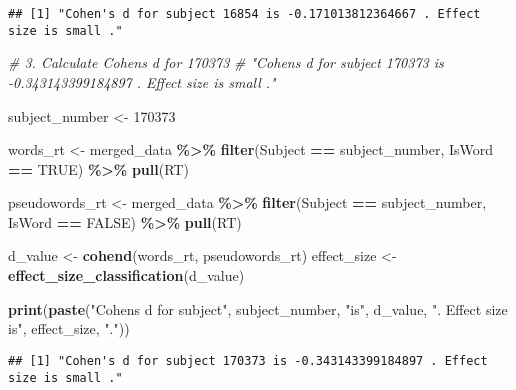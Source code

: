 \documentclass[
]{article}
\newenvironment{Shaded}{\begin{snugshade}}{\end{snugshade}}
\newcommand{\CommentTok}[1]{\textcolor[rgb]{0.56,0.35,0.01}{\textit{#1}}}
\newcommand{\ConstantTok}[1]{\textcolor[rgb]{0.56,0.35,0.01}{#1}}
\newcommand{\DecValTok}[1]{\textcolor[rgb]{0.00,0.00,0.81}{#1}}
\newcommand{\FunctionTok}[1]{\textcolor[rgb]{0.13,0.29,0.53}{\textbf{#1}}}
\newcommand{\NormalTok}[1]{#1}
\newcommand{\OtherTok}[1]{\textcolor[rgb]{0.56,0.35,0.01}{#1}}
\newcommand{\SpecialCharTok}[1]{\textcolor[rgb]{0.81,0.36,0.00}{\textbf{#1}}}
\newcommand{\StringTok}[1]{\textcolor[rgb]{0.31,0.60,0.02}{#1}}
\begin{document}
\begin{verbatim}
## [1] "Cohen's d for subject 16854 is -0.171013812364667 . Effect size is small ."
\end{verbatim}

\begin{Shaded}
\begin{Highlighting}[]
\CommentTok{\# 3. Calculate Cohen\textquotesingle{}s d for 170373}
\CommentTok{\# "Cohen\textquotesingle{}s d for subject 170373 is {-}0.343143399184897 . Effect size is small ."}

\NormalTok{subject\_number }\OtherTok{\textless{}{-}} \DecValTok{170373}

\NormalTok{words\_rt }\OtherTok{\textless{}{-}}\NormalTok{ merged\_data }\SpecialCharTok{\%\textgreater{}\%}
  \FunctionTok{filter}\NormalTok{(Subject }\SpecialCharTok{==}\NormalTok{ subject\_number, IsWord }\SpecialCharTok{==} \ConstantTok{TRUE}\NormalTok{) }\SpecialCharTok{\%\textgreater{}\%}
  \FunctionTok{pull}\NormalTok{(RT)}

\NormalTok{pseudowords\_rt }\OtherTok{\textless{}{-}}\NormalTok{ merged\_data }\SpecialCharTok{\%\textgreater{}\%}
  \FunctionTok{filter}\NormalTok{(Subject }\SpecialCharTok{==}\NormalTok{ subject\_number, IsWord }\SpecialCharTok{==} \ConstantTok{FALSE}\NormalTok{) }\SpecialCharTok{\%\textgreater{}\%}
  \FunctionTok{pull}\NormalTok{(RT)}

\NormalTok{d\_value }\OtherTok{\textless{}{-}} \FunctionTok{cohend}\NormalTok{(words\_rt, pseudowords\_rt)}
\NormalTok{effect\_size }\OtherTok{\textless{}{-}} \FunctionTok{effect\_size\_classification}\NormalTok{(d\_value)}

\FunctionTok{print}\NormalTok{(}\FunctionTok{paste}\NormalTok{(}\StringTok{"Cohen\textquotesingle{}s d for subject"}\NormalTok{, subject\_number, }\StringTok{"is"}\NormalTok{, d\_value, }\StringTok{". Effect size is"}\NormalTok{, effect\_size, }\StringTok{"."}\NormalTok{))}
\end{Highlighting}
\end{Shaded}

\begin{verbatim}
## [1] "Cohen's d for subject 170373 is -0.343143399184897 . Effect size is small ."
\end{verbatim}
\end{document}
